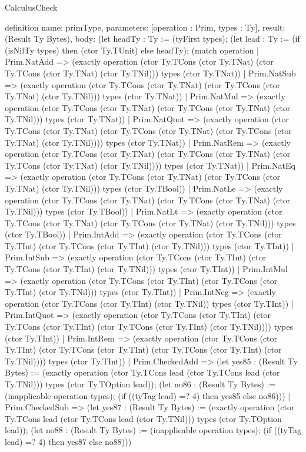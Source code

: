 \begin{lexlean}{CalculusCheck}
\begin{semanticmodule}
definition{
  name: primType,
  parameters: [operation : Prim, types : Ty],
  result: (Result Ty Bytes),
  body: (let headTy : Ty := (tyFirst types); (let lead : Ty := (if (isNilTy types) then (ctor Ty.TUnit) else headTy); (match operation
    | Prim.NatAdd => (exactly operation (ctor Ty.TCons (ctor Ty.TNat) (ctor Ty.TCons (ctor Ty.TNat) (ctor Ty.TNil))) types (ctor Ty.TNat))
    | Prim.NatSub => (exactly operation (ctor Ty.TCons (ctor Ty.TNat) (ctor Ty.TCons (ctor Ty.TNat) (ctor Ty.TNil))) types (ctor Ty.TNat))
    | Prim.NatMul => (exactly operation (ctor Ty.TCons (ctor Ty.TNat) (ctor Ty.TCons (ctor Ty.TNat) (ctor Ty.TNil))) types (ctor Ty.TNat))
    | Prim.NatQuot => (exactly operation (ctor Ty.TCons (ctor Ty.TNat) (ctor Ty.TCons (ctor Ty.TNat) (ctor Ty.TCons (ctor Ty.TNat) (ctor Ty.TNil)))) types (ctor Ty.TNat))
    | Prim.NatRem => (exactly operation (ctor Ty.TCons (ctor Ty.TNat) (ctor Ty.TCons (ctor Ty.TNat) (ctor Ty.TCons (ctor Ty.TNat) (ctor Ty.TNil)))) types (ctor Ty.TNat))
    | Prim.NatEq => (exactly operation (ctor Ty.TCons (ctor Ty.TNat) (ctor Ty.TCons (ctor Ty.TNat) (ctor Ty.TNil))) types (ctor Ty.TBool))
    | Prim.NatLe => (exactly operation (ctor Ty.TCons (ctor Ty.TNat) (ctor Ty.TCons (ctor Ty.TNat) (ctor Ty.TNil))) types (ctor Ty.TBool))
    | Prim.NatLt => (exactly operation (ctor Ty.TCons (ctor Ty.TNat) (ctor Ty.TCons (ctor Ty.TNat) (ctor Ty.TNil))) types (ctor Ty.TBool))
    | Prim.IntAdd => (exactly operation (ctor Ty.TCons (ctor Ty.TInt) (ctor Ty.TCons (ctor Ty.TInt) (ctor Ty.TNil))) types (ctor Ty.TInt))
    | Prim.IntSub => (exactly operation (ctor Ty.TCons (ctor Ty.TInt) (ctor Ty.TCons (ctor Ty.TInt) (ctor Ty.TNil))) types (ctor Ty.TInt))
    | Prim.IntMul => (exactly operation (ctor Ty.TCons (ctor Ty.TInt) (ctor Ty.TCons (ctor Ty.TInt) (ctor Ty.TNil))) types (ctor Ty.TInt))
    | Prim.IntNeg => (exactly operation (ctor Ty.TCons (ctor Ty.TInt) (ctor Ty.TNil)) types (ctor Ty.TInt))
    | Prim.IntQuot => (exactly operation (ctor Ty.TCons (ctor Ty.TInt) (ctor Ty.TCons (ctor Ty.TInt) (ctor Ty.TCons (ctor Ty.TInt) (ctor Ty.TNil)))) types (ctor Ty.TInt))
    | Prim.IntRem => (exactly operation (ctor Ty.TCons (ctor Ty.TInt) (ctor Ty.TCons (ctor Ty.TInt) (ctor Ty.TCons (ctor Ty.TInt) (ctor Ty.TNil)))) types (ctor Ty.TInt))
    | Prim.CheckedAdd => (let yes85 : (Result Ty Bytes) := (exactly operation (ctor Ty.TCons lead (ctor Ty.TCons lead (ctor Ty.TNil))) types (ctor Ty.TOption lead)); (let no86 : (Result Ty Bytes) := (inapplicable operation types); (if ((tyTag lead) =? 4) then yes85 else no86)))
    | Prim.CheckedSub => (let yes87 : (Result Ty Bytes) := (exactly operation (ctor Ty.TCons lead (ctor Ty.TCons lead (ctor Ty.TNil))) types (ctor Ty.TOption lead)); (let no88 : (Result Ty Bytes) := (inapplicable operation types); (if ((tyTag lead) =? 4) then yes87 else no88)))
}
\end{semanticmodule}
\end{lexlean}
